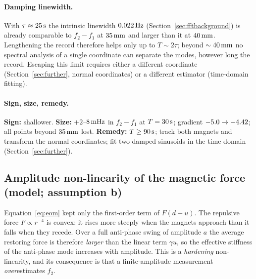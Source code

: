 \paragraph{Damping linewidth.} With $\tau\approx25\,\mathrm{s}$ the intrinsic linewidth $0.022\,\mathrm{Hz}$ (Section~\ref{sec:fftbackground}) is already comparable to $f_2-f_1$ at $35\,\mathrm{mm}$ and larger than it at $40\,\mathrm{mm}$. Lengthening the record therefore helps only up to $T\sim2\tau$; beyond $\sim40\,\mathrm{mm}$ no spectral analysis of a single coordinate can separate the modes, however long the record. Escaping this limit requires either a different coordinate (Section~\ref{sec:further}, normal coordinates) or a different estimator (time-domain fitting).

\paragraph{Sign, size, remedy.} \textbf{Sign:} shallower. \textbf{Size:} $+2$--$8\,\mathrm{mHz}$ in $f_2-f_1$ at $T=30\,\mathrm{s}$; gradient $-5.0\to-4.42$; all points beyond $35\,\mathrm{mm}$ lost. \textbf{Remedy:} $T\geq90\,\mathrm{s}$; track both magnets and transform the normal coordinates; fit two damped sinusoids in the time domain (Section~\ref{sec:further}).

\subsection{Amplitude non-linearity of the magnetic force (model; assumption b)}\label{sec:nonlinear}

Equation~\eqref{eq:eom} kept only the first-order term of $F(d+u)$. The repulsive force $F\propto r^{-4}$ is convex: it rises more steeply when the magnets approach than it falls when they recede. Over a full anti-phase swing of amplitude $a$ the average restoring force is therefore \emph{larger} than the linear term $\gamma u$, so the effective stiffness of the anti-phase mode increases with amplitude. This is a \emph{hardening} non-linearity, and its consequence is that a finite-amplitude measurement \emph{over}estimates $f_2$.

